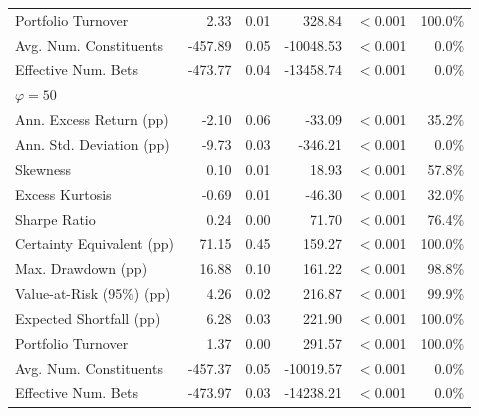 \begin{tabular*}{\textwidth}{l@{\extracolsep{\fill}}rrrrr}
Portfolio Turnover & 2.33 & 0.01 & 328.84 & $<$0.001 & 100.0\% \\
Avg. Num. Constituents & -457.89 & 0.05 & -10048.53 & $<$0.001 & 0.0\% \\
Effective Num. Bets & -473.77 & 0.04 & -13458.74 & $<$0.001 & 0.0\% \\
\midrule
\multicolumn{6}{l}{\textit{$\varphi = 50$}} \\
\midrule
Ann. Excess Return (pp) & -2.10 & 0.06 & -33.09 & $<$0.001 & 35.2\% \\
Ann. Std. Deviation (pp) & -9.73 & 0.03 & -346.21 & $<$0.001 & 0.0\% \\
Skewness & 0.10 & 0.01 & 18.93 & $<$0.001 & 57.8\% \\
Excess Kurtosis & -0.69 & 0.01 & -46.30 & $<$0.001 & 32.0\% \\
Sharpe Ratio & 0.24 & 0.00 & 71.70 & $<$0.001 & 76.4\% \\
Certainty Equivalent (pp) & 71.15 & 0.45 & 159.27 & $<$0.001 & 100.0\% \\
Max. Drawdown (pp) & 16.88 & 0.10 & 161.22 & $<$0.001 & 98.8\% \\
Value-at-Risk (95\%) (pp) & 4.26 & 0.02 & 216.87 & $<$0.001 & 99.9\% \\
Expected Shortfall (pp) & 6.28 & 0.03 & 221.90 & $<$0.001 & 100.0\% \\
Portfolio Turnover & 1.37 & 0.00 & 291.57 & $<$0.001 & 100.0\% \\
Avg. Num. Constituents & -457.37 & 0.05 & -10019.57 & $<$0.001 & 0.0\% \\
Effective Num. Bets & -473.97 & 0.03 & -14238.21 & $<$0.001 & 0.0\% \\
\bottomrule
\end{tabular*}
